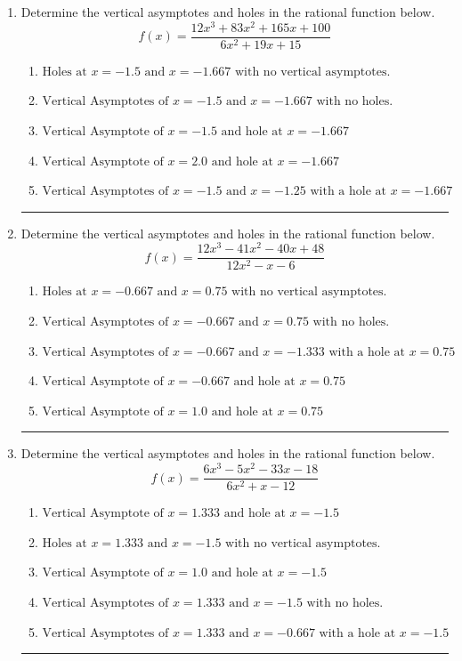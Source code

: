 \documentclass[14pt]{extbook}
\newcommand{\litem}[1]{\item#1\hspace*{-1cm}\rule{\textwidth}{0.4pt}}
\begin{document}
\begin{enumerate}
\litem{
Determine the vertical asymptotes and holes in the rational function below.\[ f(x) = \frac{12x^{3} +83 x^{2} +165 x + 100}{6x^{2} +19 x + 15} \]\begin{enumerate}[label=\Alph*.]
\item \( \text{Holes at } x = -1.5 \text{ and } x = -1.667 \text{ with no vertical asymptotes.} \)
\item \( \text{Vertical Asymptotes of } x = -1.5 \text{ and } x = -1.667 \text{ with no holes.} \)
\item \( \text{Vertical Asymptote of } x = -1.5 \text{ and hole at } x = -1.667 \)
\item \( \text{Vertical Asymptote of } x = 2.0 \text{ and hole at } x = -1.667 \)
\item \( \text{Vertical Asymptotes of } x = -1.5 \text{ and } x = -1.25 \text{ with a hole at } x = -1.667 \)

\end{enumerate} }
\litem{
Determine the vertical asymptotes and holes in the rational function below.\[ f(x) = \frac{12x^{3} -41 x^{2} -40 x + 48}{12x^{2} -x -6} \]\begin{enumerate}[label=\Alph*.]
\item \( \text{Holes at } x = -0.667 \text{ and } x = 0.75 \text{ with no vertical asymptotes.} \)
\item \( \text{Vertical Asymptotes of } x = -0.667 \text{ and } x = 0.75 \text{ with no holes.} \)
\item \( \text{Vertical Asymptotes of } x = -0.667 \text{ and } x = -1.333 \text{ with a hole at } x = 0.75 \)
\item \( \text{Vertical Asymptote of } x = -0.667 \text{ and hole at } x = 0.75 \)
\item \( \text{Vertical Asymptote of } x = 1.0 \text{ and hole at } x = 0.75 \)

\end{enumerate} }
\litem{
Determine the vertical asymptotes and holes in the rational function below.\[ f(x) = \frac{6x^{3} -5 x^{2} -33 x -18}{6x^{2} +x -12} \]\begin{enumerate}[label=\Alph*.]
\item \( \text{Vertical Asymptote of } x = 1.333 \text{ and hole at } x = -1.5 \)
\item \( \text{Holes at } x = 1.333 \text{ and } x = -1.5 \text{ with no vertical asymptotes.} \)
\item \( \text{Vertical Asymptote of } x = 1.0 \text{ and hole at } x = -1.5 \)
\item \( \text{Vertical Asymptotes of } x = 1.333 \text{ and } x = -1.5 \text{ with no holes.} \)
\item \( \text{Vertical Asymptotes of } x = 1.333 \text{ and } x = -0.667 \text{ with a hole at } x = -1.5 \)


\end{enumerate}}
\end{enumerate}
\end{document}
